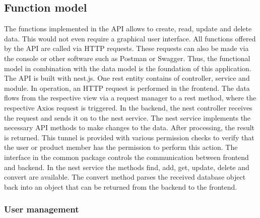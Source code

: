     \subsection*{Function model} 
    The functions implemented in the API allows to create, read, update and delete data. This would not even require a graphical user interface. All functions offered by the API are called via HTTP requests. These requests can also be made via the console or other software such as Postman or Swagger. Thus, the functional model in combination with the data model is the foundation of this application. The API is built with nest.js. One rest entity contains of controller, service and module. In operation, an HTTP request is performed in the frontend. The data flows from the respective view via a request manager to a rest method, where the respective Axios request is triggered. In the backend, the nest controller receives the request and sends it on to the nest service. The nest service implements the necessary API methods to make changes to the data. After processing, the result is returned. This tunnel is provided with various permission checks to verify that the user or product member has the permission to perform this action. The interface in the common package controls the communication between frontend and backend. In the nest service the methods find, add, get, update, delete and convert are available. The convert method parses the received database object back into an object that can be returned from the backend to the frontend.

    \subsubsection*{User management}


